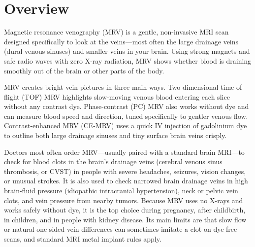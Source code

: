 \label{ch:infographic-mrv}

\section{Overview}

Magnetic resonance venography (MRV) is a gentle, non-invasive MRI scan designed specifically to look at the veins---most often the large drainage veins (dural venous sinuses) and smaller veins in your brain. Using strong magnets and safe radio waves with zero X-ray radiation, MRV shows whether blood is draining smoothly out of the brain or other parts of the body.

MRV creates bright vein pictures in three main ways. Two-dimensional time-of-flight (TOF) MRV highlights slow-moving venous blood entering each slice without any contrast dye. Phase-contrast (PC) MRV also works without dye and can measure blood speed and direction, tuned specifically to gentler venous flow. Contrast-enhanced MRV (CE-MRV) uses a quick IV injection of gadolinium dye to outline both large drainage sinuses and tiny surface brain veins crisply.

Doctors most often order MRV---usually paired with a standard brain MRI---to check for blood clots in the brain's drainage veins (cerebral venous sinus thrombosis, or CVST) in people with severe headaches, seizures, vision changes, or unusual strokes. It is also used to check narrowed brain drainage veins in high brain-fluid pressure (idiopathic intracranial hypertension), neck or pelvic vein clots, and vein pressure from nearby tumors. Because MRV uses no X-rays and works safely without dye, it is the top choice during pregnancy, after childbirth, in children, and in people with kidney disease. Its main limits are that slow flow or natural one-sided vein differences can sometimes imitate a clot on dye-free scans, and standard MRI metal implant rules apply.

